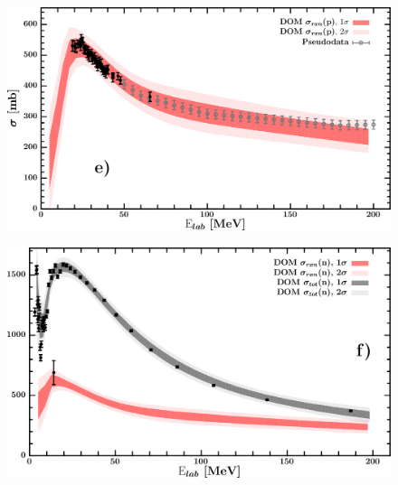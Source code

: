 \documentclass[twocolumn,secnumarabic,amssymb, nobibnotes, aps, prl,
superscriptaddress, nobalancelastpage, draft]{revtex4}
\newcommand{\oSix}{\ensuremath{^{16}}O}
\begin{document}
\begin{figure}[!htb]
\begin{minipage}{0.4\linewidth}
        \label{DOM_o16_neutron_elastic}
    \end{minipage}
    \centering
    \begin{minipage}{0.4\linewidth}
        \centering
        \includegraphics[width=\linewidth]{figures/o16_protonInelastic.png}
        \label{DOM_o16_proton_inelastic}
    \end{minipage}\hspace{6pt}
    \begin{minipage}{0.4\linewidth}
        \centering
        \includegraphics[width=\linewidth]{figures/o16_neutronInelastic.png}
        \label{DOM_o16_neutron_inelastic}
    \end{minipage}
    \centering
    \begin{minipage}{0.4\linewidth}
        \centering

\end{minipage}
\end{figure}
\end{document}
